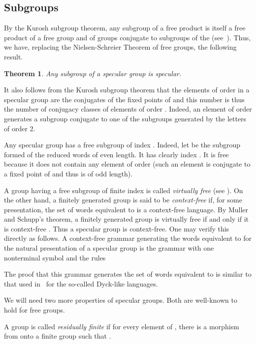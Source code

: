\documentclass[preprint,12pt]{elsarticle}
\newtheorem{theorem}{Theorem}
\numberwithin{theorem}{section}
\numberwithin{equation}{section}
\numberwithin{figure}{section}
\numberwithin{table}{section}
\begin{document}
\subsection{Subgroups}
\label{subsec:sub}
By the Kurosh subgroup theorem, any subgroup of a free product  is itself a free product of a free group and of groups conjugate to subgroups of the  (see~\cite{MagnusKarrassSolitar2004}).
Thus, we have, replacing  the Nielsen-Schreier Theorem of free groups, the following result.

\begin{theorem}
\label{theoremKurosh}
Any subgroup of a specular group is specular.
\end{theorem}

It also follows from the Kurosh subgroup theorem that the elements of order  in a specular group  are the conjugates of the  fixed points of  and this number is thus the number
of conjugacy classes of elements of order .
Indeed, an element of order  generates a subgroup conjugate to one of the subgroups generated by the letters of order 2.

Any specular group  has a free subgroup of index . Indeed, let
 be the subgroup formed of the reduced words of even length. It has
clearly index . It is free because it does not contain any element
of order  (such an element is conjugate to a fixed point of 
and thus is of odd length). 

A group having a free subgroup of finite index is called \emph{virtually
free} (see \cite{Harpe2000}). On the other hand, a finitely generated group is
said to be \emph{context-free} if, for some presentation, the set
of words equivalent to  is a context-free language.
By Muller and Schupp's theorem,
a finitely generated group is virtually free if and only if
it is context-free \cite{MullerSchupp1983}. 
Thus a specular group is context-free. One may
verify this directly as follows. A
context-free grammar generating the words equivalent to  for the
natural presentation of a specular group  is the
grammar with one nonterminal symbol  and the rules

The proof that this grammar generates the set of words
equivalent to  is similar to that used in~\cite{Berstel1979}
for the so-called Dyck-like languages.

We will need two more properties of specular groups.
Both are well-known to hold for free groups.

A group  is called \emph{residually finite} if for every element  of , there is a morphism  from  onto a finite group such that .
\end{document}
